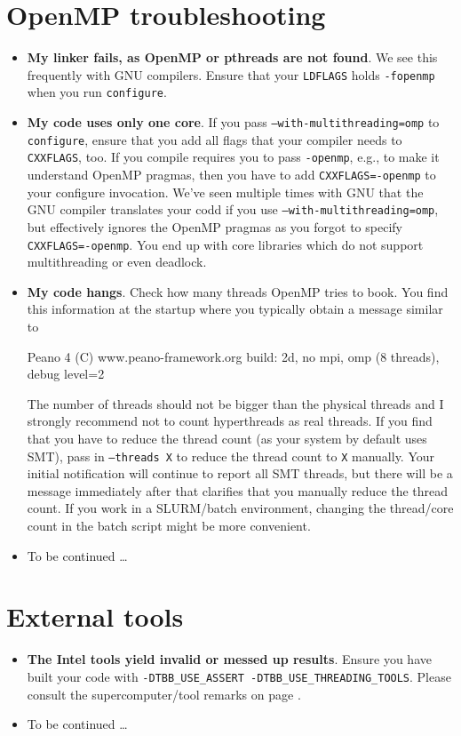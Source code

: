 \section{OpenMP troubleshooting}
\begin{itemize}
  \item \textbf{My linker fails, as OpenMP or pthreads are not found}. We see
  this frequently with GNU compilers. Ensure that your \texttt{LDFLAGS} holds
  \texttt{-fopenmp} when you run \texttt{configure}.
  \item \textbf{My code uses only one core}. If you pass
  \texttt{--with-multithreading=omp} to \texttt{configure}, ensure that you add
  all flags that your compiler needs to \texttt{CXXFLAGS}, too. If you compile
  requires you to pass \texttt{-openmp}, e.g., to make it understand OpenMP
  pragmas, then you have to add \texttt{CXXFLAGS=-openmp} to your configure
  invocation. We've seen multiple times with GNU that the GNU compiler
  translates your codd if you use \texttt{--with-multithreading=omp}, but
  effectively ignores the OpenMP pragmas as you forgot to specify
  \texttt{CXXFLAGS=-openmp}. You end up with core libraries which do not support
  multithreading or even deadlock.
  \item \textbf{My code hangs}. Check how many threads OpenMP tries to book. You
  find this information at the startup where you typically obtain a message
  similar to 
  \begin{code}
Peano 4 (C) www.peano-framework.org 
build: 2d, no mpi, omp (8 threads), debug level=2
  \end{code}
  The number of threads should not be bigger than the physical threads and I
  strongly recommend not to count hyperthreads as real threads. If you find that
  you have to reduce the thread count (as your system by default uses SMT), pass
  in \texttt{--threads X} to reduce the thread count to \texttt{X} manually.
  Your initial notification will continue to report all SMT threads, but there
  will be a message immediately after that clarifies that you manually reduce
  the thread count. If you work in a SLURM/batch environment, changing the
  thread/core count in the batch script might be more convenient.
  \item To be continued \dots
\end{itemize}



\section{External tools}
\begin{itemize}
  \item \textbf{The Intel tools yield invalid or messed up results}. Ensure 
    you have built your code with \texttt{-DTBB\_USE\_ASSERT
    -DTBB\_USE\_THREADING\_TOOLS}. Please consult the supercomputer/tool remarks
    on page \pageref{section:supercomputers:IntelTools}.
  \item To be continued \dots
\end{itemize}



